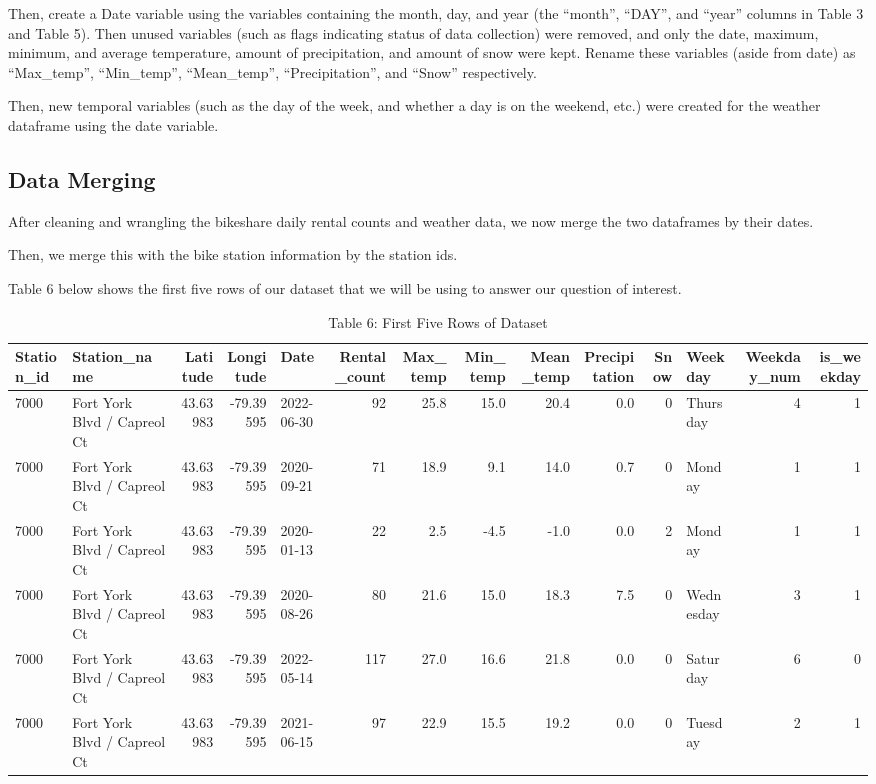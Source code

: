 \documentclass[
]{article}
\begin{document}
Then, create a Date variable using the variables containing the month,
day, and year (the ``month'', ``DAY'', and ``year'' columns in Table 3
and Table 5). Then unused variables (such as flags indicating status of
data collection) were removed, and only the date, maximum, minimum, and
average temperature, amount of precipitation, and amount of snow were
kept. Rename these variables (aside from date) as ``Max\_temp'',
``Min\_temp'', ``Mean\_temp'', ``Precipitation'', and ``Snow''
respectively.

Then, new temporal variables (such as the day of the week, and whether a
day is on the weekend, etc.) were created for the weather dataframe
using the date variable.

\hypertarget{data-merging}{%
\subsection{Data Merging}\label{data-merging}}

After cleaning and wrangling the bikeshare daily rental counts and
weather data, we now merge the two dataframes by their dates.

Then, we merge this with the bike station information by the station
ids.

Table 6 below shows the first five rows of our dataset that we will be
using to answer our question of interest.

\begin{table}[!h]

\caption{\label{tab:Table 6 First Five Rows of Dataset}Table 6: First Five Rows of Dataset}
\centering
\begin{tabular}[t]{l|l|r|r|l|r|r|r|r|r|r|l|r|r}
\hline
Station\_id & Station\_name & Latitude & Longitude & Date & Rental\_count & Max\_temp & Min\_temp & Mean\_temp & Precipitation & Snow & Weekday & Weekday\_num & is\_weekday\\
\hline
7000 & Fort York  Blvd / Capreol Ct & 43.63983 & -79.39595 & 2022-06-30 & 92 & 25.8 & 15.0 & 20.4 & 0.0 & 0 & Thursday & 4 & 1\\
\hline
7000 & Fort York  Blvd / Capreol Ct & 43.63983 & -79.39595 & 2020-09-21 & 71 & 18.9 & 9.1 & 14.0 & 0.7 & 0 & Monday & 1 & 1\\
\hline
7000 & Fort York  Blvd / Capreol Ct & 43.63983 & -79.39595 & 2020-01-13 & 22 & 2.5 & -4.5 & -1.0 & 0.0 & 2 & Monday & 1 & 1\\
\hline
7000 & Fort York  Blvd / Capreol Ct & 43.63983 & -79.39595 & 2020-08-26 & 80 & 21.6 & 15.0 & 18.3 & 7.5 & 0 & Wednesday & 3 & 1\\
\hline
7000 & Fort York  Blvd / Capreol Ct & 43.63983 & -79.39595 & 2022-05-14 & 117 & 27.0 & 16.6 & 21.8 & 0.0 & 0 & Saturday & 6 & 0\\
\hline
7000 & Fort York  Blvd / Capreol Ct & 43.63983 & -79.39595 & 2021-06-15 & 97 & 22.9 & 15.5 & 19.2 & 0.0 & 0 & Tuesday & 2 & 1\\
\hline
\end{tabular}
\end{table}
\end{document}
